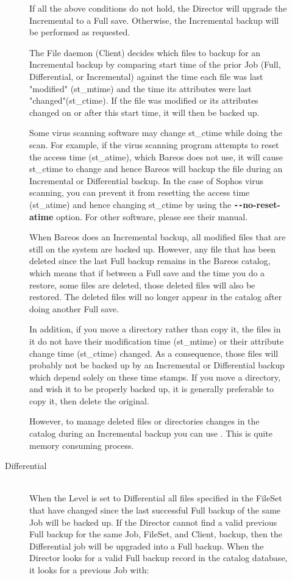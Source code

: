 \begin{description}
\begin{description}
If all the above conditions do not hold, the Director will upgrade  the
Incremental to a Full save. Otherwise, the Incremental  backup will be
performed as requested.

The File daemon (Client) decides which files to backup for an
Incremental backup by comparing start time of the prior Job (Full,
Differential, or Incremental) against the time each file was last
"modified" (st\_mtime) and the time its attributes were last
"changed"(st\_ctime).  If the file was modified or its attributes
changed on or after this start time, it will then be backed up.

Some virus scanning software may change st\_ctime while
doing the scan.  For example, if the virus scanning program attempts to
reset the access time (st\_atime), which Bareos does not use, it will
cause st\_ctime to change and hence Bareos will backup the file during
an Incremental or Differential backup.  In the case of Sophos virus
scanning, you can prevent it from resetting the access time (st\_atime)
and hence changing st\_ctime by using the {\bf \verb:--:no-reset-atime}
option.  For other software, please see their manual.

When Bareos does an Incremental backup, all modified files that are
still on the system are backed up.  However, any file that has been
deleted since the last Full backup remains in the Bareos catalog,
which means that if between a Full save and the time you do a
restore, some files are deleted, those deleted files will also be
restored.  The deleted files will no longer appear in the catalog
after doing another Full save.

In addition, if you move a directory rather than copy it, the files in
it do not have their modification time (st\_mtime) or their attribute
change time (st\_ctime) changed.  As a consequence, those files will
probably not be backed up by an Incremental or Differential backup which
depend solely on these time stamps.  If you move a directory, and wish
it to be properly backed up, it is generally preferable to copy it, then
delete the original.

However, to manage deleted files or directories changes in the
catalog during an Incremental backup you can use .
This is quite memory consuming process.

\item [Differential] \hfill \\
When the Level is set to Differential
all files specified in the FileSet that have changed since the last
successful Full backup of the same Job will be backed up.
If the Director cannot find a
valid previous Full backup for the same Job, FileSet, and Client,
backup, then the Differential job will be upgraded into a Full backup.
When the Director looks for a valid Full backup record in the catalog
database, it looks for a previous Job with:


\end{description}
\end{description}
